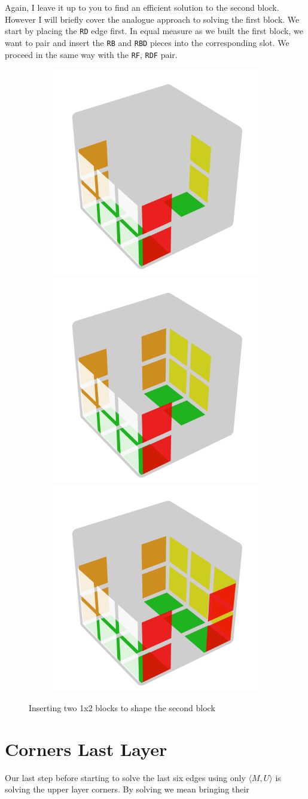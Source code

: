 \documentclass[a4paper]{scrreprt}
\begin{document}
Again, I leave it up to you to find an efficient solution to the second block. However I will briefly cover the analogue approach to solving the first block. We start by placing the \texttt{RD} edge first. In equal measure as we built the first block, we want to pair and insert the \texttt{RB} and \texttt{RBD} pieces into the corresponding slot. We proceed in the same way with the \texttt{RF}, \texttt{RDF} pair.

\begin{figure}[h]
\centering
\begin{subfigure}{.9\textwidth}
   \includegraphics[width=.3\linewidth]{resources/sb_1.png}
  \includegraphics[width=.3\linewidth]{resources/sb_2.png}
  \includegraphics[width=.3\linewidth]{resources/sb_3.png}
\end{subfigure}
\caption*{Inserting two 1x2 blocks to shape the second block}
\end{figure}

\section{Corners Last Layer}
Our last step before starting to solve the last six edges using only $\langle M, U \rangle$ is solving the upper layer corners. By solving we mean bringing their 
\end{document}
